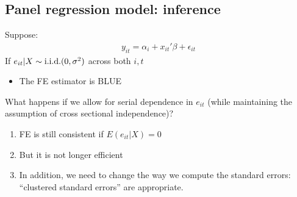 \documentclass[a4paper,twoside,11pt]{article}
\begin{document}
\subsection{Panel regression model: inference}
Suppose:
\begin{equation*}
\begin{aligned}
y_{it} = \alpha_i + x_{it}' \beta + \epsilon_{it}
\end{aligned} 
\end{equation*}
If $e_{it}|X\sim \textmd{i.i.d.} (0, \sigma^2)$ across both $i,t$
\begin{itemize}
    \item The FE estimator is BLUE
\end{itemize}
What happens if we allow for serial dependence in $e_{it}$ (while maintaining the assumption of cross sectional independence)?
\begin{enumerate}
    \item FE is still consistent if $E(e_{it}|X)=0$
    \item But it is not longer efficient 
    \item In addition, we need to change the way we compute the standard errors:
    “clustered standard errors” are appropriate.
\end{enumerate}
\end{document}
